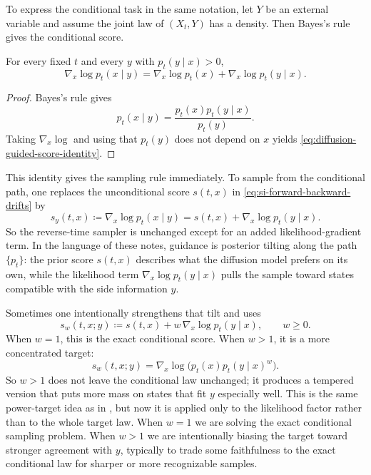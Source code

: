 To express the conditional task in the same notation, let \(Y\) be an external variable and assume the joint law of \((X_t,Y)\) has a density.
Then Bayes's rule gives the conditional score.

\begin{proposition}
\label{prop:diffusion-guided-score-identity}
For every fixed \(t\) and every \(y\) with \(p_t(y\mid x)>0\),
\begin{equation}
  \nabla_x \log p_t(x\mid y)
  =
  \nabla_x \log p_t(x)
  +
  \nabla_x \log p_t(y\mid x).
  \label{eq:diffusion-guided-score-identity}
\end{equation}
\end{proposition}
\begin{proof}
Bayes's rule gives
\[
  p_t(x\mid y)=\frac{p_t(x)p_t(y\mid x)}{p_t(y)}.
\]
Taking \(\nabla_x\log\) and using that \(p_t(y)\) does not depend on \(x\) yields \eqref{eq:diffusion-guided-score-identity}.%
\end{proof}

This identity gives the sampling rule immediately.
To sample from the conditional path, one replaces the unconditional score \(s(t,x)\) in \eqref{eq:si-forward-backward-drifts} by
\[
  s_y(t,x)
  \coloneqq
  \nabla_x \log p_t(x\mid y)
  =
  s(t,x)+\nabla_x \log p_t(y\mid x).
\]
So the reverse-time sampler is unchanged except for an added likelihood-gradient term.
In the language of these notes, guidance is posterior tilting along the path \(\{p_t\}\):
the prior score \(s(t,x)\) describes what the diffusion model prefers on its own, while the likelihood term \(\nabla_x\log p_t(y\mid x)\) pulls the sample toward states compatible with the side information \(y\).

Sometimes one intentionally strengthens that tilt and uses
\begin{equation}
  s_w(t,x;y)
  \coloneqq
  s(t,x)+w\,\nabla_x \log p_t(y\mid x),
  \qquad w\ge 0.
  \label{eq:diffusion-weighted-conditional-score}
\end{equation}
When \(w=1\), this is the exact conditional score.
When \(w>1\), it is a more concentrated target:
\[
  s_w(t,x;y)
  =
  \nabla_x \log \bigl(p_t(x)p_t(y\mid x)^w\bigr).
\]
So \(w>1\) does not leave the conditional law unchanged; it produces a tempered version that puts more mass on states that fit \(y\) especially well.
This is the same power-target idea as in , but now it is applied only to the likelihood factor rather than to the whole target law.
When \(w=1\) we are solving the exact conditional sampling problem.
When \(w>1\) we are intentionally biasing the target toward stronger agreement with \(y\), typically to trade some faithfulness to the exact conditional law for sharper or more recognizable samples.

